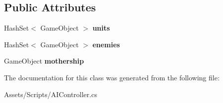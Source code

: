 \subsection*{Public Attributes}
\begin{DoxyCompactItemize}
\item 
\hypertarget{class_a_i_controller_a4b8a5c97c0fb6cf61eec392547a3514f}{}Hash\+Set$<$ Game\+Object $>$ {\bfseries units}\label{class_a_i_controller_a4b8a5c97c0fb6cf61eec392547a3514f}

\item 
\hypertarget{class_a_i_controller_a94a988b0c68154f5437c3254e229ec8c}{}Hash\+Set$<$ Game\+Object $>$ {\bfseries enemies}\label{class_a_i_controller_a94a988b0c68154f5437c3254e229ec8c}

\item 
\hypertarget{class_a_i_controller_ae6e9e675c8cfa60e56721cb0da4010bf}{}Game\+Object {\bfseries mothership}\label{class_a_i_controller_ae6e9e675c8cfa60e56721cb0da4010bf}

\end{DoxyCompactItemize}


The documentation for this class was generated from the following file\+:\begin{DoxyCompactItemize}
\item 
Assets/\+Scripts/A\+I\+Controller.\+cs\end{DoxyCompactItemize}
